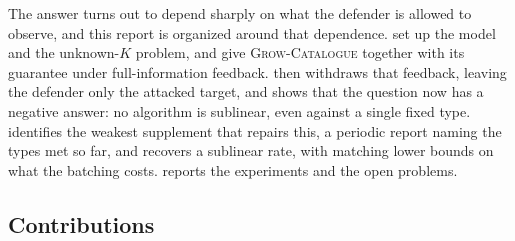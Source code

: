 \documentclass[letterpaper,9pt,twocolumn]{extarticle}
\theoremstyle{plain}
\theoremstyle{definition}
\theoremstyle{remark}
\begin{document}
The answer turns out to depend sharply on what the defender is allowed to
observe, and this report is organized around that dependence.
 set up the model and the unknown-$K$ problem,
and  give \textsc{Grow-Catalogue} together with its
guarantee under full-information feedback.  then withdraws
that feedback, leaving the defender only the attacked target, and shows that
the question now has a negative answer: no algorithm is sublinear, even
against a single fixed type.  identifies the weakest
supplement that repairs this, a periodic report naming the types met so
far, and recovers a sublinear rate, with matching lower bounds on what
the batching costs.  reports the experiments and
 the open problems.

\subsection{Contributions}
\label{sec:contrib}
\end{document}

